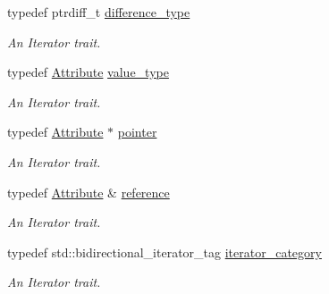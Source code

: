\begin{DoxyCompactItemize}
\item 
\hypertarget{classphys_1_1xml_1_1AttributeIterator_a9ce268d2fe4a507c7a9b3f687cbc7dbf}{
typedef ptrdiff\_\-t \hyperlink{classphys_1_1xml_1_1AttributeIterator_a9ce268d2fe4a507c7a9b3f687cbc7dbf}{difference\_\-type}}
\label{classphys_1_1xml_1_1AttributeIterator_a9ce268d2fe4a507c7a9b3f687cbc7dbf}

\begin{DoxyCompactList}\small\item\em An Iterator trait. \item\end{DoxyCompactList}\item 
\hypertarget{classphys_1_1xml_1_1AttributeIterator_a2802171caa10acb5b47bca7576f346f7}{
typedef \hyperlink{classphys_1_1xml_1_1Attribute}{Attribute} \hyperlink{classphys_1_1xml_1_1AttributeIterator_a2802171caa10acb5b47bca7576f346f7}{value\_\-type}}
\label{classphys_1_1xml_1_1AttributeIterator_a2802171caa10acb5b47bca7576f346f7}

\begin{DoxyCompactList}\small\item\em An Iterator trait. \item\end{DoxyCompactList}\item 
\hypertarget{classphys_1_1xml_1_1AttributeIterator_a87ea5bf9f43a66eca8675625486376ab}{
typedef \hyperlink{classphys_1_1xml_1_1Attribute}{Attribute} $\ast$ \hyperlink{classphys_1_1xml_1_1AttributeIterator_a87ea5bf9f43a66eca8675625486376ab}{pointer}}
\label{classphys_1_1xml_1_1AttributeIterator_a87ea5bf9f43a66eca8675625486376ab}

\begin{DoxyCompactList}\small\item\em An Iterator trait. \item\end{DoxyCompactList}\item 
\hypertarget{classphys_1_1xml_1_1AttributeIterator_a55e06f521ba2e8a78bd77f447c172a3f}{
typedef \hyperlink{classphys_1_1xml_1_1Attribute}{Attribute} \& \hyperlink{classphys_1_1xml_1_1AttributeIterator_a55e06f521ba2e8a78bd77f447c172a3f}{reference}}
\label{classphys_1_1xml_1_1AttributeIterator_a55e06f521ba2e8a78bd77f447c172a3f}

\begin{DoxyCompactList}\small\item\em An Iterator trait. \item\end{DoxyCompactList}\item 
\hypertarget{classphys_1_1xml_1_1AttributeIterator_ab731cb4734fb2f2d6e1f3e106ac97ee3}{
typedef std::bidirectional\_\-iterator\_\-tag \hyperlink{classphys_1_1xml_1_1AttributeIterator_ab731cb4734fb2f2d6e1f3e106ac97ee3}{iterator\_\-category}}
\label{classphys_1_1xml_1_1AttributeIterator_ab731cb4734fb2f2d6e1f3e106ac97ee3}

\begin{DoxyCompactList}\small\item\em An Iterator trait. \item\end{DoxyCompactList}\end{DoxyCompactItemize}
